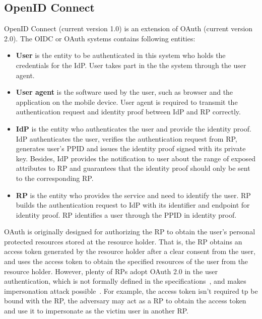 \subsection{OpenID Connect}
OpenID Connect (current version 1.0) is an extension of OAuth (current version 2.0). The OIDC or OAuth systems contains following entities:
\begin{itemize}
    \item \textbf{User} is the entity to be authenticated in this system who holds the credentials for the IdP. User takes part in the the system through the user agent. 
    \item \textbf{User agent} is the software used by the user, such as browser and the application on the mobile device. User agent is required to transmit the authentication request and identity proof between IdP and RP correctly. 
     \item \textbf{IdP} is the entity who authenticates the user and provide the identity proof. IdP authenticates the user, verifies the authentication request from RP, generates user's PPID and issues the identity proof signed with its private key. Besides, IdP provides the notification to user about the range of exposed attributes to RP and guarantees that the identity proof should only be sent to the corresponding RP. 
    \item \textbf{RP} is the entity who provides the service and need to identify the user. RP builds the authentication request to IdP with its identifier and endpoint for identity proof. RP identifies a user through the PPID in identity proof.  
\end{itemize}
OAuth is originally designed for authorizing the RP to obtain the user's personal protected resources stored at the resource holder. That is, the RP obtains an access token generated by the resource holder after a clear consent from the user, and  uses the access token to obtain the specified resources of the user from the resource holder. However, plenty of RPs adopt OAuth 2.0 in the user authentication, which is not formally defined in the specifications~\cite{rfc6749,rfc6750}, and makes impersonation attack possible~\cite{ChenPCTKT14, WangZLG16}. For example, the access token isn't required tp be bound with the RP, the adversary may act as a RP to obtain the access token and use it to impersonate as the victim user in another RP.



